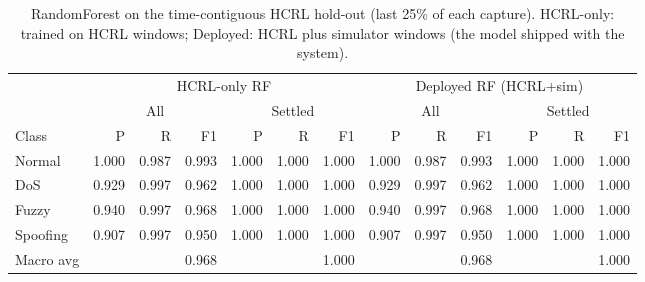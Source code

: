 \begin{table}[t]
\centering
\footnotesize
\caption{RandomForest on the time-contiguous HCRL hold-out (last 25\% of each capture). HCRL-only: trained on HCRL windows; Deployed: HCRL plus simulator windows (the model shipped with the system).}
\label{tab:hcrl_rf_perclass}
\begin{tabular}{lrrrrrrrrrrrr}
\toprule
& \multicolumn{6}{c}{HCRL-only RF} & \multicolumn{6}{c}{Deployed RF (HCRL+sim)} \\
& \multicolumn{3}{c}{All} & \multicolumn{3}{c}{Settled} & \multicolumn{3}{c}{All} & \multicolumn{3}{c}{Settled} \\
\cmidrule(lr){2-4}\cmidrule(lr){5-7}\cmidrule(lr){8-10}\cmidrule(lr){11-13}
Class & P & R & F1 & P & R & F1 & P & R & F1 & P & R & F1 \\
\midrule
Normal & 1.000 & 0.987 & 0.993 & 1.000 & 1.000 & 1.000 & 1.000 & 0.987 & 0.993 & 1.000 & 1.000 & 1.000 \\
DoS & 0.929 & 0.997 & 0.962 & 1.000 & 1.000 & 1.000 & 0.929 & 0.997 & 0.962 & 1.000 & 1.000 & 1.000 \\
Fuzzy & 0.940 & 0.997 & 0.968 & 1.000 & 1.000 & 1.000 & 0.940 & 0.997 & 0.968 & 1.000 & 1.000 & 1.000 \\
Spoofing & 0.907 & 0.997 & 0.950 & 1.000 & 1.000 & 1.000 & 0.907 & 0.997 & 0.950 & 1.000 & 1.000 & 1.000 \\
\midrule
Macro avg &  &  & 0.968 &  &  & 1.000 &  &  & 0.968 &  &  & 1.000 \\
\bottomrule
\end{tabular}
\end{table}
